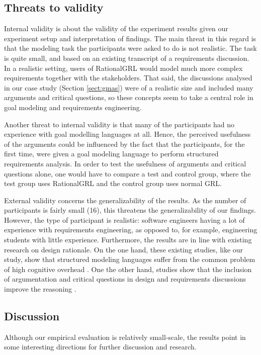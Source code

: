 \subsection{Threats to validity}
Internal validity is about the validity of the experiment results given our experiment setup and interpretation of findings. The main threat in this regard is that the modeling task the participants were asked to do is not realistic. The task is quite small, and based on an existing transcript of a requirements discussion. In a realistic setting, users of RationalGRL would model much more complex requirements together with the stakeholders. That said, the discussions analysed in our case study (Section \ref{sect:gmas}) were of a realistic size and included many arguments and critical questions, so these concepts seem to take a central role in goal modeling and requirements engineering. 

Another threat to internal validity is that many of the participants had no experience with goal modelling languages at all. Hence, the perceived usefulness of the arguments could be influenced by the fact that the participants, for the first time, were given a goal modeling language to perform structured requirements analysis. In order to test the usefulness of arguments and critical questions alone, one would have to compare a test and control group, where the test group uses RationalGRL and the control group uses normal GRL. 

External validity concerns the generalizability of the results. As the number of participants is fairly small (16), this threatens the generalizability of our findings. However, the type of participant is realistic: software engineers having a lot of experience with requirements engineering, as opposed to, for example, engineering students with little experience. Furthermore, the results are in line with existing research on design rationale. On the one hand, these existing studies, like our study, show that structured modeling languages suffer from the common problem of high cognitive overhead \cite{shum2006hypermedia}. One the other hand, studies show that the inclusion of argumentation and critical questions in design and requirements discussions improve the reasoning \cite{razavian2016two,TangEtal2018}.

\subsection{Discussion}
Although our empirical evaluation is relatively small-scale, the results point in some interesting directions for further discussion and research. 

